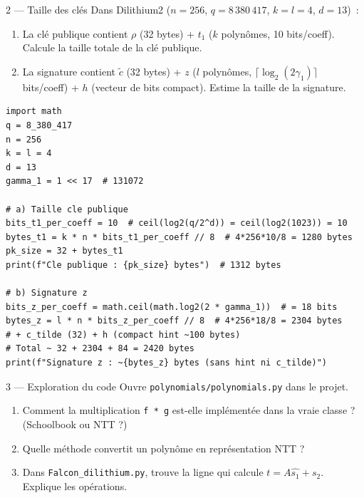\documentclass[12pt, a4paper]{article}
\begin{document}
\begin{exercice}{2 --- Taille des clés}
Dans Dilithium2 ($n=256$, $q=8\,380\,417$, $k=l=4$, $d=13$)~:
\begin{enumerate}[label=\alph*)]
  \item La clé publique contient $\rho$ (32 bytes) + $t_1$ ($k$ polynômes, 10 bits/coeff).
        Calcule la taille totale de la clé publique.
  \item La signature contient $\tilde{c}$ (32 bytes) + $z$ ($l$ polynômes, $\lceil \log_2(2\gamma_1) \rceil$ bits/coeff)
        + $h$ (vecteur de bits compact). Estime la taille de la signature.
\end{enumerate}
\end{exercice}

\begin{solution}
\begin{lstlisting}[style=python]
import math
q = 8_380_417
n = 256
k = l = 4
d = 13
gamma_1 = 1 << 17  # 131072

# a) Taille cle publique
bits_t1_per_coeff = 10  # ceil(log2(q/2^d)) = ceil(log2(1023)) = 10
bytes_t1 = k * n * bits_t1_per_coeff // 8  # 4*256*10/8 = 1280 bytes
pk_size = 32 + bytes_t1
print(f"Cle publique : {pk_size} bytes")  # 1312 bytes

# b) Signature z
bits_z_per_coeff = math.ceil(math.log2(2 * gamma_1))  # = 18 bits
bytes_z = l * n * bits_z_per_coeff // 8  # 4*256*18/8 = 2304 bytes
# + c_tilde (32) + h (compact hint ~100 bytes)
# Total ~ 32 + 2304 + 84 = 2420 bytes
print(f"Signature z : ~{bytes_z} bytes (sans hint ni c_tilde)")
\end{lstlisting}
\end{solution}

\begin{exercice}{3 --- Exploration du code}
Ouvre \texttt{polynomials/polynomials.py} dans le projet.
\begin{enumerate}[label=\alph*)]
  \item Comment la multiplication \texttt{f * g} est-elle implémentée
        dans la vraie classe ? (Schoolbook ou NTT ?)
  \item Quelle méthode convertit un polynôme en représentation NTT ?
  \item Dans \texttt{Falcon\_dilithium.py}, trouve la ligne qui calcule
        $t = A \hat{s_1} + s_2$. Explique les opérations.
\end{enumerate}
\end{exercice}
\end{document}

